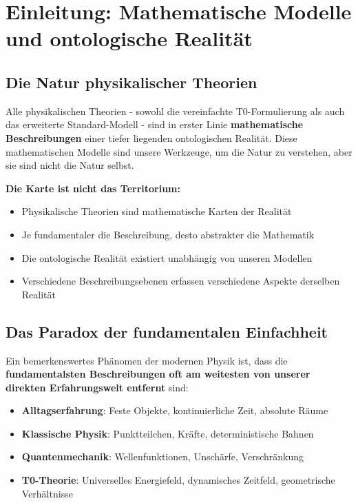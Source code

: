\section{Einleitung: Mathematische Modelle und ontologische Realität}

	
	\subsection{Die Natur physikalischer Theorien}
	
	Alle physikalischen Theorien - sowohl die vereinfachte T0-Formulierung als auch das erweiterte Standard-Modell - sind in erster Linie \textbf{mathematische Beschreibungen} einer tiefer liegenden ontologischen Realität. Diese mathematischen Modelle sind unsere Werkzeuge, um die Natur zu verstehen, aber sie sind nicht die Natur selbst.
	
	\begin{tcolorbox}[colback=gray!5!white,colframe=gray!75!black,title=Fundamentale Erkenntnistheoretische Einsicht]
		\textbf{Die Karte ist nicht das Territorium:}
		\begin{itemize}
			\item Physikalische Theorien sind mathematische Karten der Realität
			\item Je fundamentaler die Beschreibung, desto abstrakter die Mathematik
			\item Die ontologische Realität existiert unabhängig von unseren Modellen
			\item Verschiedene Beschreibungsebenen erfassen verschiedene Aspekte derselben Realität
		\end{itemize}
	\end{tcolorbox}
	
	\subsection{Das Paradox der fundamentalen Einfachheit}
	
	Ein bemerkenswertes Phänomen der modernen Physik ist, dass die \textbf{fundamentalsten Beschreibungen oft am weitesten von unserer direkten Erfahrungswelt entfernt} sind:
	
	\begin{itemize}
		\item \textbf{Alltagserfahrung}: Feste Objekte, kontinuierliche Zeit, absolute Räume
		\item \textbf{Klassische Physik}: Punktteilchen, Kräfte, deterministische Bahnen
		\item \textbf{Quantenmechanik}: Wellenfunktionen, Unschärfe, Verschränkung
		\item \textbf{T0-Theorie}: Universelles Energiefeld, dynamisches Zeitfeld, geometrische Verhältnisse
	\end{itemize}
	
